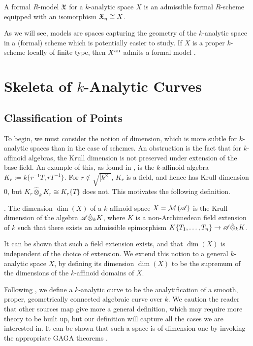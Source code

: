 \begin{defn}
    A formal $R$-model $\mathfrak{X}$ for a $k$-analytic space $X$ is an admissible formal $R$-scheme equipped with an isomorphism $\mathfrak{X}_{\eta} \cong X$.
\end{defn}

As we will see, models are spaces capturing the geometry of the $k$-analytic space in a (formal) scheme which is potentially easier to study.
If $X$ is a proper $k$-scheme locally of finite type, then $X^{\text{an}}$ admits a formal model \parencite[Remark 5.3.3.2]{temk}.

\section{Skeleta of $k$-Analytic Curves}

\subsection{Classification of Points}

To begin, we must consider the notion of dimension, which is more subtle for $k$-analytic spaces than in the case of schemes.
An obstruction is the fact that for $k$-affinoid algebras, the Krull dimension is not preserved under extension of the base field.
An example of this, as found in \parencite[\S 3.5]{temk}, is the $k$-affinoid algebra $K_r := k\{r^{-1} T, rT^{-1}\}$.
For $r \not\in \sqrt{|k^{\times}|}$, $K_r$ is a field, and hence has Krull dimension $0$, but $K_r \hat{\otimes}_{k} K_r \cong K_r\{T\}$ does not.
This motivates the following definition.

\begin{defn} \parencite[\S 2.3]{berk1}.
    The dimension $\dim(X)$ of a $k$-affinoid space $X = \mathcal{M}\left(\mathscr{A}\right)$ is the Krull dimension of the algebra $\mathscr{A} \hat{\otimes}_{k} K$, where $K$ is a non-Archimedean field extension of $k$ such that there exists an admissible epimorphism $K\{T_1, \dots, T_n\} \to \mathscr{A} \hat{\otimes}_{k} K$.
\end{defn}

 It can be shown that such a field extension exists, and that $\dim(X)$ is independent of the choice of extension.
 We extend this notion to a general $k$-analytic space $X$, by defining its dimension $\dim(X)$ to be the supremum of the dimensions of the $k$-affinoid domains of $X$.
 
 Following \parencite{bpr}, we define a $k$-analytic curve to be the analytification of a smooth, proper, geometrically connected algebraic curve over $k$.
 We caution the reader that other sources map give more a general definition, which may require more theory to be built up, but our definition will capture all the cases we are interested in.
 It can be shown that such a space is of dimension one by invoking the appropriate GAGA theorems \parencite[Corollary 3.2.8]{berk1} \parencite[Proposition 3.4.3]{berk1}.

